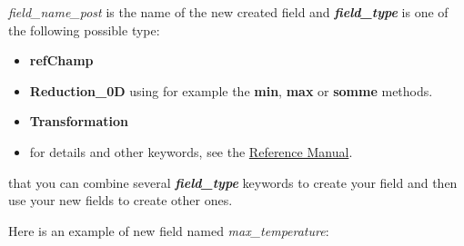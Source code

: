 \begin{itemize}
\textit{field\_name\_post} is the name of the new created field and \textbf{\textit{field\_type}} is one of the following possible type:
\begin{itemize}
\item \textbf{refChamp}
\item \textbf{Reduction\_0D} using for example the \textbf{min}, \textbf{max} or \textbf{somme} methods.
\item \textbf{Transformation}
\item for details and other keywords, see the \href{TRUST_Reference_Manual.pdf\#definitionchamps}{\trust Reference Manual}.
\end{itemize}

\Note that you can combine several \textbf{\textit{field\_type}} keywords to create your field and then use your new fields to create other ones.\\

\newpage

Here is an example of new field named \textit{max\_temperature}:

\begin{center}
\end{center}
\end{itemize}
